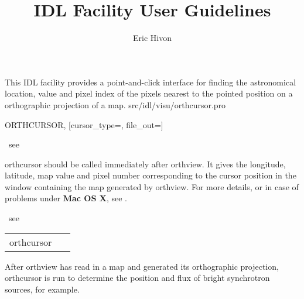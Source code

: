 




\sloppy



\title{\healpix IDL Facility User Guidelines}
 \section[orthcursor]{ }
\label{idl:\thedocid}
\author{Eric Hivon}


\begin{facility}
{This IDL facility provides a point-and-click interface for finding
the astronomical location, value and pixel index of the pixels nearest 
to the pointed position on a orthographic projection of a \healpix map.}
{src/idl/visu/orthcursor.pro}
\end{facility}

\begin{IDLformat}
{ORTHCURSOR, [cursor\_type=, file\_out=]}
\end{IDLformat}

\begin{qualifiers}
\hbox{\hspace{5cm}		see }
\end{qualifiers}

\begin{codedescription}
{orthcursor should be called immediately after orthview. It gives the longitude,
latitude, map value and pixel number
corresponding to the cursor position in the window containing the map generated
by orthview. For more details, or in case
of problems under {\bf Mac OS X}, see .}
\end{codedescription}



\begin{related}
\hbox{\hspace{5cm}	see }
\end{related}


\begin{example}
{
\begin{tabular}{ll} %
orthcursor & \ 
\end{tabular}
}
{After orthview has read in a map and generated
its orthographic projection, orthcursor is run to determine the
position and flux of bright synchrotron sources, for example.}
\end{example}


